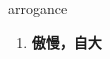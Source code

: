 
\begin{frame}
{\huge arrogance}
\begin{center}
\begin{enumerate}\Large
  \item \textbf{傲慢，自大}
\end{enumerate}
\end{center}
\end{frame}
